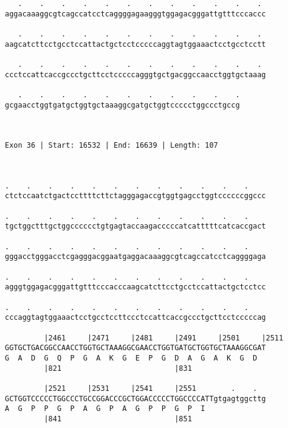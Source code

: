 \documentclass{article}
\begin{document}
\begin{Verbatim}
   .    .    .    .    .    .    .    .    .    .    .    . 
aggacaaaggcgtcagccatcctcaggggagaagggtggagacgggattgtttcccaccc
                                                            
   .    .    .    .    .    .    .    .    .    .    .    . 
aagcatcttcctgcctccattactgctcctcccccaggtagtggaaactcctgcctcctt
                                                            
   .    .    .    .    .    .    .    .    .    .    .    . 
ccctccattcaccgccctgcttcctcccccagggtgctgacggccaacctggtgctaaag
                                                            
   .    .    .    .    .    .    .    .    .    .    .
gcgaacctggtgatgctggtgctaaaggcgatgctggtccccctggccctgccg
                                                      
                                                      
 
Exon 36 | Start: 16532 | End: 16639 | Length: 107



.    .    .    .    .    .    .    .    .    .    .    .    
ctctccaatctgactccttttcttctagggagaccgtggtgagcctggtccccccggccc
                                                            
.    .    .    .    .    .    .    .    .    .    .    .    
tgctggctttgctggcccccctgtgagtaccaagacccccatcatttttcatcaccgact
                                                            
.    .    .    .    .    .    .    .    .    .    .    .    
gggacctgggacctcgagggacggaatgaggacaaaggcgtcagccatcctcaggggaga
                                                            
.    .    .    .    .    .    .    .    .    .    .    .    
agggtggagacgggattgtttcccacccaagcatcttcctgcctccattactgctcctcc
                                                            
.    .    .    .    .    .    .    .    .    .    .    .    
cccaggtagtggaaactcctgcctccttccctccattcaccgccctgcttcctcccccag
                                                            
         |2461     |2471     |2481     |2491     |2501     |2511
GGTGCTGACGGCCAACCTGGTGCTAAAGGCGAACCTGGTGATGCTGGTGCTAAAGGCGAT
G  A  D  G  Q  P  G  A  K  G  E  P  G  D  A  G  A  K  G  D  
         |821                          |831                 
  
         |2521     |2531     |2541     |2551        .    .  
GCTGGTCCCCCTGGCCCTGCCGGACCCGCTGGACCCCCTGGCCCCATTgtgagtggcttg
A  G  P  P  G  P  A  G  P  A  G  P  P  G  P  I              
         |841                          |851                 
  

\end{Verbatim}
\end{document}
